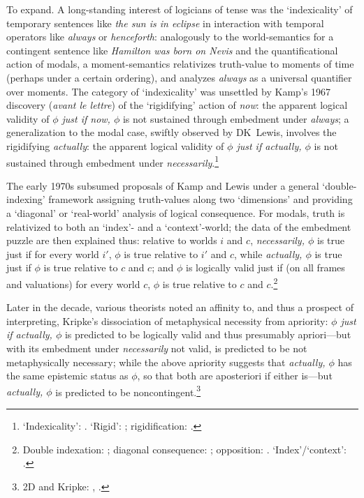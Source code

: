 \documentclass[12pt]{article}
\begin{document}
To expand. A long-standing interest of logicians of tense was the
`indexicality' of temporary sentences like \emph{the sun is in eclipse} in
interaction with temporal operators like \emph{always} or \emph{henceforth}:
analogously to the world-semantics for a contingent sentence like
\emph{Hamilton was born on Nevis} and the quantificational action of modals, a
moment-semantics relativizes truth-value to moments of time (perhaps under a
certain ordering), and analyzes \emph{always} as a universal quantifier over
moments. The category of `indexicality' was unsettled by Kamp's 1967 discovery
(\emph{avant le lettre}) of the `rigidifying' action of \emph{now}: the
apparent logical validity of \emph{$\phi$ just if now, $\phi$} is not
sustained through embedment under \emph{always}; a generalization to the modal
case, swiftly observed by DK~Lewis, involves the rigidifying \emph{actually}:
the apparent logical validity of \emph{$\phi$ just if actually, $\phi$} is not
sustained through embedment under \emph{necessarily}.\footnote{`Indexicality':
\citep{montagueprag,montaguepragil,lewis70gs}. `Rigid': \citep{kripke72};
rigidification: \citep{kamp68,kamp71,Prior1968-PRIN-3,lewis70}.}

The early 1970s subsumed proposals of Kamp and Lewis under a general
`double-indexing' framework assigning truth-values along two `dimensions' and
providing a `diagonal' or `real-world' analysis of logical consequence. For
modals, truth is relativized to both an `index'- and a `context'-world; the
data of the embedment puzzle are then explained thus: relative to worlds $i$
and $c$, \emph{necessarily, $\phi$} is true just if for every world $i'$,
$\phi$ is true relative to $i'$ and $c$, while \emph{actually, $\phi$} is true
just if $\phi$ is true relative to $c$ and $c$; and $\phi$ is logically valid
just if (on all frames and valuations) for every world $c$, $\phi$ is true
relative to $c$ and $c$.\footnote{Double indexation: \citep{segerberg73};
diagonal consequence:
\citep{Vlach1973-VLANAT,kaplan77,fritz11,Fritz2014-FRIWIT-2}; opposition:
\citep{crossleyhumberstone77,davieshumberstone81,Hanson2006-HANANA-5,Hanson2014-HANLTI}.
`Index'/`context': \citep{lewis80icc}.}

Later in the decade, various theorists noted an affinity to, and thus a
prospect of interpreting, Kripke's dissociation of metaphysical necessity from
apriority: \emph{$\phi$ just if actually, $\phi$} is predicted to be logically
valid and thus presumably apriori---but with its embedment under
\emph{necessarily} not valid, is predicted to be not metaphysically necessary;
while the above apriority suggests that \emph{actually, $\phi$} has the same
epistemic status as $\phi$, so that both are aposteriori if either is---but
\emph{actually, $\phi$} is predicted to be noncontingent.\footnote{2D and
Kripke: \citep[pp.~172--3]{lewis75ll},
\citep{kaplan77,stalnaker78,Evans1979-EVARAC,davieshumberstone81}.}
\end{document}
